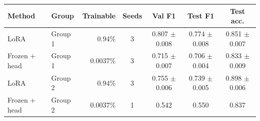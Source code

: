 \begin{tabular}{llrcccc}
\toprule
\textbf{Method} & \textbf{Group} & \textbf{Trainable} & \textbf{Seeds} & \textbf{Val F1} & \textbf{Test F1} & \textbf{Test acc.} \\
\midrule
LoRA & Group 1 & 0.94\% & 3 & 0.807 $\pm$ 0.008 & 0.774 $\pm$ 0.008 & 0.851 $\pm$ 0.007 \\
Frozen + head & Group 1 & 0.0037\% & 3 & 0.715 $\pm$ 0.007 & 0.706 $\pm$ 0.004 & 0.833 $\pm$ 0.009 \\
LoRA & Group 2 & 0.94\% & 3 & 0.755 $\pm$ 0.006 & 0.739 $\pm$ 0.005 & 0.898 $\pm$ 0.006 \\
Frozen + head & Group 2 & 0.0037\% & 1 & 0.542 & 0.550 & 0.837 \\
\bottomrule
\end{tabular}
